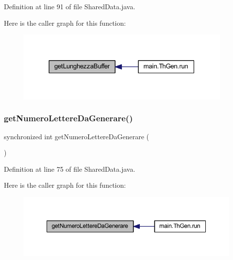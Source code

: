 Definition at line 91 of file Shared\+Data.\+java.

Here is the caller graph for this function\+:
\nopagebreak
\begin{figure}[H]
\begin{center}
\leavevmode
\includegraphics[width=304pt]{classmain_1_1_shared_data_a2f606346e7f2ae2e2da2ad211c0bf08a_icgraph}
\end{center}
\end{figure}
\mbox{\label{classmain_1_1_shared_data_a7400b59cc3ba24fdb82489e16d602c92}} 
\subsubsection{\texorpdfstring{get\+Numero\+Lettere\+Da\+Generare()}{getNumeroLettereDaGenerare()}}
{\footnotesize\ttfamily synchronized int get\+Numero\+Lettere\+Da\+Generare (\begin{DoxyParamCaption}{ }\end{DoxyParamCaption})}



Definition at line 75 of file Shared\+Data.\+java.

Here is the caller graph for this function\+:
\nopagebreak
\begin{figure}[H]
\begin{center}
\leavevmode
\includegraphics[width=348pt]{classmain_1_1_shared_data_a7400b59cc3ba24fdb82489e16d602c92_icgraph}
\end{center}
\end{figure}
\mbox{\label{classmain_1_1_shared_data_a560577008f849ccb788cc398fce280d1}} 
